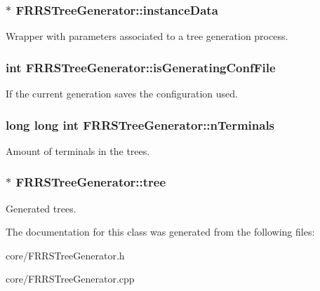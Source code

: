 \subsubsection[{\texorpdfstring{instance\+Data}{instanceData}}]{$\ast$ F\+R\+R\+S\+Tree\+Generator\+::instance\+Data\hspace{0.3cm}{\ttfamily [private]}}\hypertarget{class_f_r_r_s_tree_generator_a7e68f9ebd5171fbdc79d8ebac7ccc61c}{}\label{class_f_r_r_s_tree_generator_a7e68f9ebd5171fbdc79d8ebac7ccc61c}
Wrapper with parameters associated to a tree generation process. 
\subsubsection[{\texorpdfstring{is\+Generating\+Conf\+File}{isGeneratingConfFile}}]{\setlength{\rightskip}{0pt plus 5cm}int F\+R\+R\+S\+Tree\+Generator\+::is\+Generating\+Conf\+File\hspace{0.3cm}{\ttfamily [private]}}\hypertarget{class_f_r_r_s_tree_generator_a6fc7001478ea0ce3c7ea4df930239221}{}\label{class_f_r_r_s_tree_generator_a6fc7001478ea0ce3c7ea4df930239221}
If the current generation saves the configuration used. 
\subsubsection[{\texorpdfstring{n\+Terminals}{nTerminals}}]{\setlength{\rightskip}{0pt plus 5cm}long long int F\+R\+R\+S\+Tree\+Generator\+::n\+Terminals\hspace{0.3cm}{\ttfamily [private]}}\hypertarget{class_f_r_r_s_tree_generator_a90d76e26de1b890e167ac570286b7615}{}\label{class_f_r_r_s_tree_generator_a90d76e26de1b890e167ac570286b7615}
Amount of terminals in the trees. 
\subsubsection[{\texorpdfstring{tree}{tree}}]{$\ast$ F\+R\+R\+S\+Tree\+Generator\+::tree\hspace{0.3cm}{\ttfamily [private]}}\hypertarget{class_f_r_r_s_tree_generator_a9ff03e7c286d96e19d2fa658d167f519}{}\label{class_f_r_r_s_tree_generator_a9ff03e7c286d96e19d2fa658d167f519}
Generated trees. 

The documentation for this class was generated from the following files\+:\begin{DoxyCompactItemize}
\item 
core/F\+R\+R\+S\+Tree\+Generator.\+h\item 
core/F\+R\+R\+S\+Tree\+Generator.\+cpp\end{DoxyCompactItemize}
